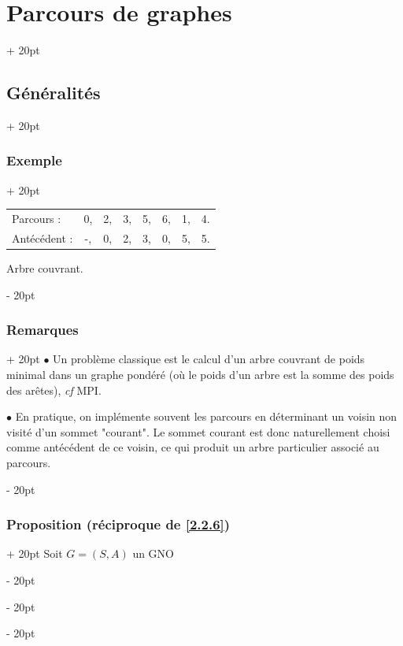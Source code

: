 \documentclass[a4paper, 12pt, twoside]{article}
\renewcommand{\emph}{\textcolor{ff4500}}
\newcommand{\ind}[1][20pt]{\advance\leftskip + #1}
\newcommand{\deind}[1][20pt]{\advance\leftskip - #1}
\newenvironment{indt}[2][20pt]{#2 \par \ind[#1]}{\par \deind} %
\begin{document}
\begin{indt}{\section{Parcours de graphes}}
\begin{indt}{\subsection{Généralités}}
\begin{indt}{\subsubsection{Exemple}}
\begin{center}
                \end{center}

                \begin{tabular}{lccccccc}
                    Parcours :   & 0, & 2, & 3, & 5, & 6, & 1, & 4.
                    \\
                    Antécédent : & -, & 0, & 2, & 3, & 0, & 5, & 5.
                \end{tabular}

                \emph{Arbre couvrant}.
            \end{indt}

            \vspace{12pt}
            
            \begin{indt}{\subsubsection{Remarques}}
                $\bullet$ Un problème classique est le calcul d'un arbre couvrant de poids minimal dans un graphe pondéré (où le poids d'un arbre est la somme des poids des arêtes), \textit{cf} MPI.

                $\bullet$ En pratique, on implémente souvent les parcours en déterminant un voisin non visité d'un sommet "courant". Le sommet courant est donc naturellement choisi comme antécédent de ce voisin, ce qui produit un arbre particulier associé au parcours.
            \end{indt}

            \vspace{12pt}
            
            \begin{indt}{\subsubsection{Proposition (réciproque de \ref{2.2.6})}}
                \label{4.1.8}
                Soit $G = (S, A)$ un GNO


\end{indt}
\end{indt}
\end{indt}
\end{document}
